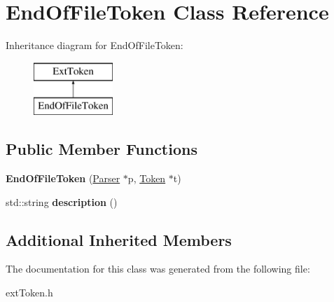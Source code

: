 \hypertarget{class_end_of_file_token}{}\section{End\+Of\+File\+Token Class Reference}
\label{class_end_of_file_token}
Inheritance diagram for End\+Of\+File\+Token\+:\begin{figure}[H]
\begin{center}
\leavevmode
\includegraphics[height=2.000000cm]{class_end_of_file_token}
\end{center}
\end{figure}
\subsection*{Public Member Functions}
\begin{DoxyCompactItemize}
\item 
\hypertarget{class_end_of_file_token_a5c093bc13648a4f4df525ea4242e59d9}{}{\bfseries End\+Of\+File\+Token} (\hyperlink{class_parser}{Parser} $\ast$p, \hyperlink{class_token}{Token} $\ast$t)\label{class_end_of_file_token_a5c093bc13648a4f4df525ea4242e59d9}

\item 
\hypertarget{class_end_of_file_token_a918312b101ca8cc7fb5ba4e56bc12b58}{}std\+::string {\bfseries description} ()\label{class_end_of_file_token_a918312b101ca8cc7fb5ba4e56bc12b58}

\end{DoxyCompactItemize}
\subsection*{Additional Inherited Members}


The documentation for this class was generated from the following file\+:\begin{DoxyCompactItemize}
\item 
ext\+Token.\+h\end{DoxyCompactItemize}
